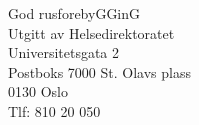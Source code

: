 \documentclass[11pt]{report} %
\begin{document}
\begin{thebibliography}{99}
                  God rusforebyGGinG\\
                  Utgitt av Helsedirektoratet\\
                  Universitetsgata 2\\
                  Postboks 7000 St. Olavs plass\\
                  0130 Oslo\\
                  Tlf: 810 20 050\\
  




              \end{thebibliography}

              \listoffigures
              \listoftables

              
\end{document}
